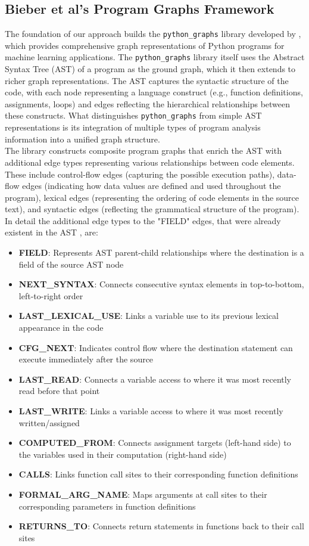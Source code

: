 \documentclass[%
thesis=student,%
coverpage=false,%
titlepage=false,%
headmarks=true, %
english,%
font=libertine, %
math=newpxtx, %
BCOR=5mm,%
coverBCOR=11mm%
]{tum-templates/book/tumbook}
\begin{document}
\subsection{Bieber et al's Program Graphs Framework}
The foundation of our approach builds the \texttt{python\_graphs} library developed by \textcite{Bieber2022}, which provides comprehensive graph representations of Python programs for machine learning applications. The \texttt{python\_graphs} library itself uses the Abstract Syntax Tree (AST) of a program as the ground graph, which it then extends to richer graph representations. The AST captures the syntactic structure of the code, with each node representing a language construct (e.g., function definitions, assignments, loops) and edges reflecting the hierarchical relationships between these constructs. What distinguishes \texttt{python\_graphs} from simple AST representations is its integration of multiple types of program analysis information into a unified graph structure. \\
The library constructs composite program graphs that enrich the AST with additional edge types representing various relationships between code elements. These include control-flow edges (capturing the possible execution paths), data-flow edges (indicating how data values are defined and used throughout the program), lexical edges (representing the ordering of code elements in the source text), and syntactic edges (reflecting the grammatical structure of the program). 
In detail the additional edge types to the "FIELD" edges, that were already existent in the AST , are:
\begin{itemize}
    \item \textbf{FIELD}: Represents AST parent-child relationships where the destination is a field of the source AST node
    \item \textbf{NEXT\_SYNTAX}: Connects consecutive syntax elements in top-to-bottom, left-to-right order
    \item \textbf{LAST\_LEXICAL\_USE}: Links a variable use to its previous lexical appearance in the code
    \item \textbf{CFG\_NEXT}: Indicates control flow where the destination statement can execute immediately after the source
    \item \textbf{LAST\_READ}: Connects a variable access to where it was most recently read before that point
    \item \textbf{LAST\_WRITE}: Links a variable access to where it was most recently written/assigned
    \item \textbf{COMPUTED\_FROM}: Connects assignment targets (left-hand side) to the variables used in their computation (right-hand side)
    \item \textbf{CALLS}: Links function call sites to their corresponding function definitions
    \item \textbf{FORMAL\_ARG\_NAME}: Maps arguments at call sites to their corresponding parameters in function definitions
    \item \textbf{RETURNS\_TO}: Connects return statements in functions back to their call sites
\end{itemize}
\end{document}
